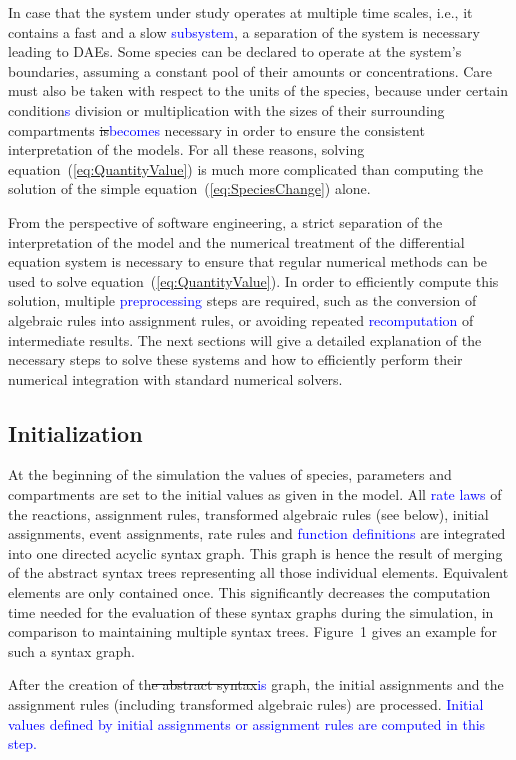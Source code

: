 \documentclass[10pt]{bmc_article}
\newenvironment{bmcformat}{\fussy\setboolean{publ}{true}}{\fussy}
\newcommand{\COR}[1]                      {\textcolor{blue}{#1}}
\begin{document}
\begin{bmcformat}
In case that the system under study operates at multiple time scales, i.e., it
contains a fast and a slow \COR{subsystem}, a separation of the system is necessary
leading to \acfp{DAE}.
Some species can be declared to operate at the system's boundaries, assuming a
constant pool of their amounts or concentrations.
Care must also be taken with respect to the units of the species, because under
certain condition\COR{s} division or multiplication with the sizes of their surrounding
compartments \sout{is}\COR{becomes} necessary in order to ensure the consistent interpretation of
the models. 
For all these reasons, solving equation~(\ref{eq:QuantityValue}) is much more 
complicated than computing the solution of the simple equation~(\ref{eq:SpeciesChange})
alone.

From the perspective of software engineering, a strict separation of the 
interpretation of the model and the numerical treatment of the differential
equation system is necessary to ensure that regular numerical methods can be used
to solve equation~(\ref{eq:QuantityValue}).
In order to efficiently compute this solution, multiple \COR{preprocessing} steps are
required, such as the conversion of algebraic rules into assignment rules, or
avoiding repeated \COR{recomputation} of intermediate results.
The next sections will give a detailed explanation of the necessary steps to
solve these systems and how to efficiently perform their numerical integration
with standard numerical solvers.


\subsection*{Initialization}

At the beginning of the simulation the values of species, parameters and compartments are set to the initial values as given in the model.
All \COR{rate laws} of the reactions, assignment rules, transformed algebraic rules (see below), initial assignments, event assignments, rate rules and \COR{function definitions} are integrated into one directed acyclic syntax graph.
This graph is hence the result of merging of the abstract syntax trees representing all those individual elements.
Equivalent elements are only contained once.
This significantly decreases the computation time needed for the evaluation of these syntax graphs during the simulation, in comparison to maintaining multiple syntax trees.
Figure~1 gives an example for such a syntax graph.

After the creation of th\sout{e abstract syntax}\COR{is} graph, the initial assignments and the
assignment rules (including transformed algebraic rules) are processed.
\COR{Initial values defined by initial assignments or assignment rules are computed in this step.}



\end{bmcformat}
\end{document}
